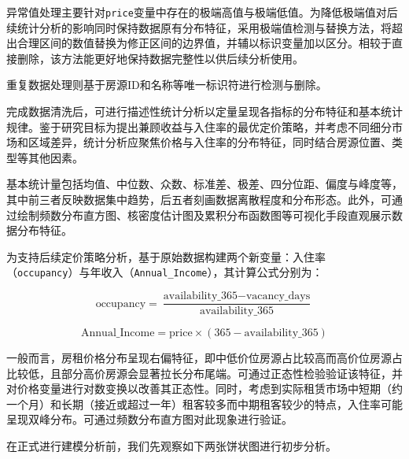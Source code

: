 \documentclass[12pt]{article}
\begin{document}
\begin{CJK}{UTF8}{gbsn}
	异常值处理主要针对\texttt{price}变量中存在的极端高值与极端低值。为降低极端值对后续统计分析的影响同时保持数据原有分布特征，采用极端值检测与替换方法，将超出合理区间的数值替换为修正区间的边界值，并辅以标识变量加以区分。相较于直接删除，该方法能更好地保持数据完整性以供后续分析使用。
	
	重复数据处理则基于房源ID和名称等唯一标识符进行检测与删除。
	
	完成数据清洗后，可进行描述性统计分析以定量呈现各指标的分布特征和基本统计规律。鉴于研究目标为提出兼顾收益与入住率的最优定价策略，并考虑不同细分市场和区域差异，统计分析应聚焦价格与入住率的分布特征，同时结合房源位置、类型等其他因素。
	
	基本统计量包括均值、中位数、众数、标准差、极差、四分位距、偏度与峰度等，其中前三者反映数据集中趋势，后五者刻画数据离散程度和分布形态。此外，可通过绘制频数分布直方图、核密度估计图及累积分布函数图等可视化手段直观展示数据分布特征。
	
	为支持后续定价策略分析，基于原始数据构建两个新变量：入住率\\（\texttt{occupancy}）与年收入（\texttt{Annual\_Income}），其计算公式分别为：
	
	\begin{equation}
		\text{occupancy} = \frac{\text{availability\_365} - \text{vacancy\_days}}{\text{availability\_365}}
	\end{equation}
	
	
	\begin{equation}
	\text{Annual\_Income} = \text{price} \times (365 - \text{availability\_365})
	\end{equation}
	
	一般而言，房租价格分布呈现右偏特征，即中低价位房源占比较高而高价位房源占比较低，且部分高价房源会显著拉长分布尾端。可通过正态性检验验证该特征，并对价格变量进行对数变换以改善其正态性。同时，考虑到实际租赁市场中短期（约一个月）和长期（接近或超过一年）租客较多而中期租客较少的特点，入住率可能呈现双峰分布。可通过频数分布直方图对此现象进行验证。
	
	在正式进行建模分析前，我们先观察如下两张饼状图进行初步分析。
	

\end{CJK}
\end{document}
